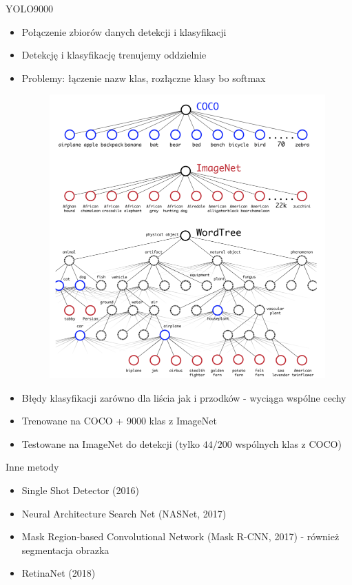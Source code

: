 \documentclass[11pt]{beamer}
\begin{document}
\begin{frame}[allowframebreaks]{YOLO9000}
\begin{itemize}
    \item Połączenie zbiorów danych detekcji i klasyfikacji
    \item Detekcję i klasyfikację trenujemy oddzielnie
    \item Problemy: łączenie nazw klas, rozłączne klasy bo softmax
    \begin{figure}
        \centering
        \includegraphics[height=0.6\textheight]{grafika/wordtree.png}
    \end{figure}
    \item Błędy klasyfikacji zarówno dla liścia jak i przodków - wyciąga wspólne cechy
    \item Trenowane na COCO + 9000 klas z ImageNet
    \item Testowane na ImageNet do detekcji (tylko $44/200$ wspólnych klas z COCO)
\end{itemize}
    
\end{frame}

\begin{frame}{Inne metody}
\begin{itemize}
    \item Single Shot Detector (2016)
    \item Neural Architecture Search Net (NASNet, 2017)
    \item Mask Region-based Convolutional Network (Mask R-CNN, 2017) - również segmentacja obrazka
    \item RetinaNet (2018)
\end{itemize}
\end{frame}
\end{document}
